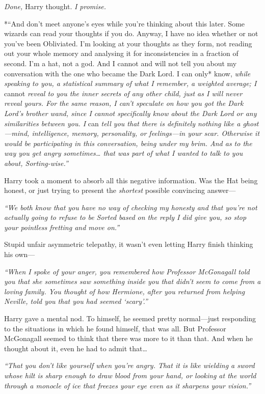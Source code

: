 \emph{Done,} Harry thought. \emph{I promise.}

*``And don't meet anyone's eyes while you're thinking about this later.
Some wizards can read your thoughts if you do. Anyway, I have no idea
whether or not you've been Obliviated. I'm looking at your thoughts as
they form, not reading out your whole memory and analysing it for
inconsistencies in a fraction of second. I'm a hat, not a god. And I
cannot and will not tell you about my conversation with the one who
became the Dark Lord. I can only* know, \emph{while speaking to you, a
statistical summary of what I remember, a weighted average; I} cannot
\emph{reveal to you the inner secrets of any other child, just as I will
never reveal yours. For the same reason, I can't speculate on how you
got the Dark Lord's brother wand, since I cannot specifically know about
the Dark Lord or any similarities between you. I} can \emph{tell you
that there is definitely nothing like a ghost---mind, intelligence,
memory, personality, or feelings---in your scar. Otherwise it would be
participating in this conversation, being under my brim. And as to the
way you get angry sometimes\ldots{} that was part of what I wanted to
talk to you about, Sorting-wise.''}

Harry took a moment to absorb all this negative information. Was the Hat
being honest, or just trying to present the \emph{shortest} possible
convincing answer---

\emph{``We both know that you have no way of checking my honesty and
that you're not actually going to refuse to be Sorted based on the reply
I did give you, so stop your pointless fretting and move on.''}

Stupid unfair asymmetric telepathy, it wasn't even letting Harry finish
thinking his own---

\emph{``When I spoke of your anger, you remembered how Professor
McGonagall told you that she sometimes saw something inside you that
didn't seem to come from a loving family. You thought of how Hermione,
after you returned from helping Neville, told you that you had seemed
`scary'.''}

Harry gave a mental nod. To himself, he seemed pretty normal---just
responding to the situations in which he found himself, that was all.
But Professor McGonagall seemed to think that there was more to it than
that. And when he thought about it, even he had to admit that\ldots{}

\emph{``That you don't like yourself when you're angry. That it is like
wielding a sword whose hilt is sharp enough to draw blood from your
hand, or looking at the world through a monocle of ice that freezes your
eye even as it sharpens your vision.''}

